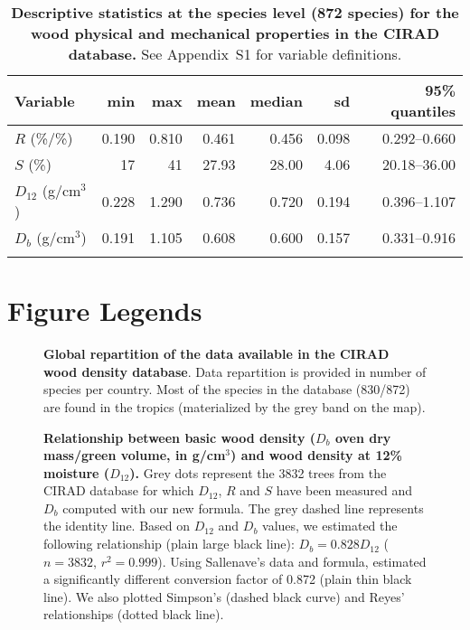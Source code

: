 \documentclass[a4paper, 12pt, leqno, dvipsnames]{article}\usepackage[]{graphicx}\usepackage[]{color}
\begin{document}
\newpage

  \begin{longtable}{@{}lrrrrrr@{}} 
    \caption{\textbf{Descriptive statistics at the species level (872 species) for the
      wood physical and mechanical properties in the CIRAD database.}
      See Appendix~S1 for variable definitions.}\label{tab:Stat}\\
    \toprule
    Variable & min & max & mean & median & sd & 95\% quantiles \\
    \midrule
    $R$ (\%/\%) & 0.190 & 0.810 & 0.461 & 0.456 & 0.098 & 0.292--0.660 \\
    $S$ (\%) & 17 & 41 & 27.93 & 28.00 & 4.06 & 20.18--36.00 \\
    $D_{12}$ (g/cm$^3$) & 0.228 & 1.290 & 0.736 & 0.720 & 0.194 & 0.396--1.107 \\
    $D_b$ (g/cm$^3$) &  0.191 & 1.105 & 0.608 & 0.600 & 0.157 & 0.331--0.916 \\
    \bottomrule\\
  \end{longtable}

\newpage

\section*{Figure Legends}

\begin{figure}[!h] 
\caption{\textbf{Global repartition of the data available in the CIRAD wood density database}. Data repartition is provided in number of species per country. Most of the species in the database (830/872) are found in the tropics (materialized by the grey band on the map).}\label{fig:Location}
\end{figure}

\begin{figure}[!h] 
  \caption{\textbf{Relationship between basic wood density ($D_b$ oven dry mass/green volume, in g/cm$^3$) and wood density at 12\% moisture ($D_{12}$).} Grey dots represent the 3832 trees from the CIRAD database for which $D_{12}$, $R$ and $S$ have been measured and $D_b$ computed with our new formula. The grey dashed line represents the identity line. Based on $D_{12}$ and $D_b$ values, we estimated the following relationship (plain large black line): $D_b=0.828 D_{12}$ ($n=3832$, $r^2=0.999$). Using Sallenave's data and formula, \citet{Chave2006} estimated a significantly different conversion factor of 0.872 (plain thin black line). We also plotted Simpson's (dashed black curve) and Reyes' relationships (dotted black line).}\label{fig:Db-D12}
  \end{figure}
\end{document}
